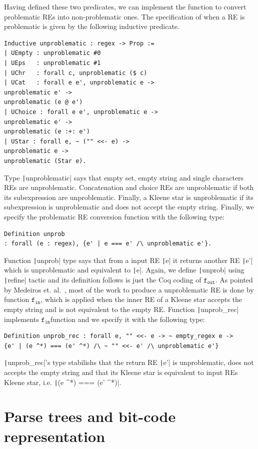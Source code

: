 \documentclass[oneside,12pt]{scrbook}
\theoremstyle{definition}
\newcommand{\fin}{\ensuremath{\texttt{f$_{\texttt{in}}$}}}
\newcommand{\fout}{\ensuremath{\texttt{f$_{\texttt{out}}$}}}
\newcommand{\coq}[1]{\texttt|#1|}
\theoremstyle{plain}
\theoremstyle{definition}
\begin{document}
Having defined these two predicates, we can implement the function to
convert problematic REs into non-problematic ones. The specification
of when a RE is problematic is given by the following inductive predicate. 
\begin{verbatim}
Inductive unproblematic : regex -> Prop :=
| UEmpty : unproblematic #0
| UEps   : unproblematic #1
| UChr   : forall c, unproblematic ($ c)
| UCat   : forall e e', unproblematic e ->
unproblematic e' ->
unproblematic (e @ e')
| UChoice : forall e e', unproblematic e ->
unproblematic e' ->
unproblematic (e :+: e')
| UStar : forall e, ~ ("" <<- e) -> 
unproblematic e -> 
unproblematic (Star e).
\end{verbatim}
Type \coq{unproblematic} says that empty set, empty string and single
characters REs are unproblematic. Concatenation and choice REs are
unproblematic if both its subexpression are unproblematic. Finally,
a Kleene star is unproblematic if its subexpression is unproblematic and
does not accept the empty string. Finally, we specify the problematic RE
conversion function with the following type:
\begin{verbatim}
Definition unprob 
: forall (e : regex), {e' | e === e' /\ unproblematic e'}.
\end{verbatim}
Function \coq{unprob} type says that from a input RE \coq{e} it returns another
RE \coq{e'} which is unproblematic and equivalent to \coq{e}. Again, we define
\coq{unprob} using \coq{refine} tactic and its definition follows is just the
Coq coding of \fout. As pointed by Medeiros et. al.~\cite{Medeiros14}, most of
the work to produce a unproblematic RE is done by function \fin, which is
applied when the inner RE of a Kleene star accepts the empty string and is not
equivalent to the empty RE. Function \coq{unprob_rec} implements \fin function
and we specify it with the following type:
\begin{verbatim}
Definition unprob_rec : forall e, "" <<- e -> ~ empty_regex e -> 
{e' | (e ^*) === (e' ^*) /\ ~ "" <<- e' /\ unproblematic e'}
\end{verbatim}
\coq{unprob_rec}'s type stabilishs that the return RE \coq{e'} is unproblematic, does not
accepts the empty string and that its Kleene star is equivalent to input REs
Kleene star, i.e.  \coq{(e ^*) === (e' ^*)}.

\section{Parse trees and bit-code representation}
\end{document}
